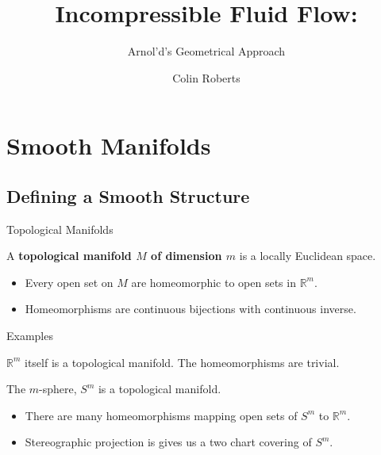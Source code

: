 \documentclass[usenames,dvipsnames]{beamer}
\title{Incompressible Fluid Flow:}
\subtitle{Arnol'd's Geometrical Approach}
\author{Colin Roberts}
\theoremstyle{definition}
\theoremstyle{theorem}
\newcommand{\R}{\mathbb{R}}
\begin{document}
{
\begin{frame}
\titlepage
\end{frame}
}


\section{Smooth Manifolds}
    \subsection{Defining a Smooth Structure}
    
    \begin{frame}{Topological Manifolds}
        \begin{definition}
            A \textbf{topological manifold $M$ of dimension $m$} is a locally Euclidean space.
        \end{definition}
        \begin{itemize}
            \item Every open set on $M$ are homeomorphic to open sets in $\R^m$.
            \item Homeomorphisms are continuous bijections with continuous inverse.
        \end{itemize}
    \end{frame}
    
    \begin{frame}{Examples}
        \begin{example}
            $\R^m$ itself is a topological manifold.  The homeomorphisms are trivial.
        \end{example}
        \begin{example}
            The $m$-sphere, $S^m$ is a topological manifold.
            \begin{itemize}
                \item There are many homeomorphisms mapping open sets of $S^m$ to $\R^m$.
                \item Stereographic projection is gives us a two chart covering of $S^m$.
            \end{itemize}
        \end{example}
    \end{frame}
    
\end{document}
